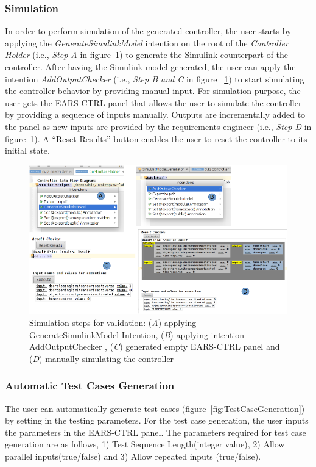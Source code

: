 \subsubsection{Simulation}
\vspace{-.2cm}
In order to perform simulation of the generated controller, the user
starts by applying the \emph{GenerateSimulinkModel} intention on the root of the
\emph{Controller Holder} (i.e., \emph{Step A}  in
figure~\ref{fig:SimulationSteps}) to generate the Simulink counterpart of the
controller.
After having the Simulink model generated, the user can apply the intention
\emph{AddOutputChecker} (i.e., \emph{Step B and C} in figure
~\ref{fig:SimulationSteps}) to start simulating the controller behavior by
providing manual input. For simulation purpose, the user gets the
\textsf{EARS-CTRL} panel that allows the user to simulate the controller by
providing a sequence of inputs manually.
Outputs are incrementally added to the panel as new inputs are provided by the
requirements engineer (i.e., \emph{Step D} in figure~\ref{fig:SimulationSteps}).
A \textsf{“Reset Results”} button enables the user to reset the controller to
its initial state. 
\begin{figure}[!h]
\centering
\includegraphics[width=1\textwidth]{./images/Simulation_Steps.png}
\caption{Simulation steps for validation: (\emph{A}) applying
GenerateSimulinkModel Intention, (\emph{B}) applying intention
\textsf{AddOutputChecker} , (\emph{C}) generated empty
\textsf{EARS-CTRL} panel and (\emph{D}) manually simulating the controller}
\label{fig:SimulationSteps}
\end{figure}
\vspace{-.3cm}
\subsubsection{Automatic Test Cases Generation} 
\vspace{-.5cm}
The user can automatically generate test cases
(figure~\ref{fig:TestCaseGeneration}) by setting in the testing parameters.
For the test case generation, the user inputs the
parameters in the \textsf{EARS-CTRL} panel.
The parameters required for test case generation are as follows, 1) \textsf{Test
Sequence Length(integer value)}, 2) \textsf{Allow parallel inputs(true/false)} and 3) \textsf{Allow repeated inputs (true/false)}.